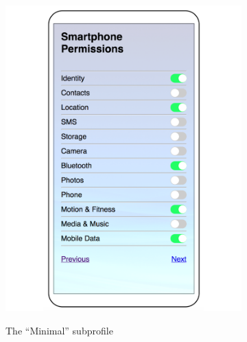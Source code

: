 \begin{figure}
\begin{subfigure}[b]{0.22\textheight}
		\includegraphics[width=0.2\textheight]{figures/pickprofile1.pdf}
		\label{fig:ppb}
		\caption{The ``Minimal'' subprofile}
	\end{subfigure}
~~
	\begin{subfigure}[b]{0.22\textheight}

\end{subfigure}
\end{figure}
